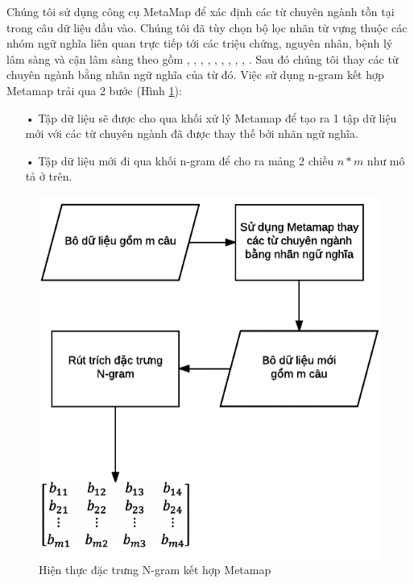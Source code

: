 Chúng tôi sử dụng công cụ MetaMap để xác định các từ chuyên ngành tồn tại trong câu dữ liệu đầu vào. Chúng tôi đã tùy chọn bộ lọc nhãn từ vựng thuộc các nhóm ngữ nghĩa liên quan trực tiếp tới các triệu chứng, nguyên nhân, bệnh lý lâm sàng và cận lâm sàng theo \cite{sarker2011outcome} gồm , , , , , , , , , . Sau đó chúng tôi thay các từ chuyên ngành bằng nhãn ngữ nghĩa của từ đó. 
Việc sử dụng n-gram kết hợp Metamap trải qua 2 bước (Hình \ref{fig:hien-thuc-metamap}):
\begin{itemize}
\item[•] Tập dữ liệu sẽ được cho qua khối xử lý Metamap để tạo ra 1 tập dữ liệu mới với các từ chuyên ngành đã được thay thế bởi nhãn ngữ nghĩa.
\item[•] Tập dữ liệu mới đi qua khối n-gram để cho ra mảng 2 chiều $n*m$ như mô tả ở trên.
\end{itemize}
\begin{figure}[h]
\centering
\includegraphics[scale=0.5]{../hinh/hien_thuc_metamap.png}
\caption{Hiện thực đặc trưng N-gram kết hợp Metamap} \label{fig:hien-thuc-metamap}
\end{figure}

